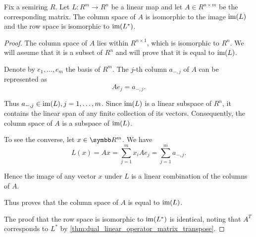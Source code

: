 \begin{proposition}\label{thm:column_and_row_spaces_are_images}
  Fix a semiring \( R \). Let \( L: R^m \to R^n \) be a linear map and let \( A \in R^{n \times m} \) be the corresponding matrix. The column space of \( A \) is isomorphic to the image \( \operatorname{im}(L) \) and the row space is isomorphic to \( \operatorname{im}(L^*) \).
\end{proposition}
\begin{proof}
  The column space of \( A \) lies within \( R^{n \times 1} \), which is isomorphic to \( R^n \). We will assume that it is a subset of \( R^n \) and will prove that it is equal to \( \operatorname{im}(L) \).

  Denote by \( e_1, \ldots, e_m \) the basis of \( R^m \). The \( j \)-th column \( a_{-,j} \) of \( A \) can be represented as
  \begin{equation*}
    A e_j = a_{-,j}.
  \end{equation*}

  Thus \( a_{-,j} \in \operatorname{im}(L), j = 1, \ldots, m \). Since \( \operatorname{im}(L) \) is a linear subspace of \( R^n \), it contains the linear span of any finite collection of its vectors. Consequently, the column space of \( A \) is a subspace of \( \operatorname{im}(L) \).

  To see the converse, let \( x \in \R^m \). We have
  \begin{equation*}
    L(x) = Ax = \sum_{j=1}^m x_i A e_j = \sum_{j=1}^m a_{-,j}.
  \end{equation*}

  Hence the image of any vector \( x \) under \( L \) is a linear combination of the columns of \( A \).

  Thus proves that the column space of \( A \) is equal to \( \operatorname{im}(L) \).

  The proof that the row space is isomorphic to \( \operatorname{im}(L^*) \) is identical, noting that \( A^T \) corresponds to \( L^* \) by \cref{thm:dual_linear_operator_matrix_transpose}.
\end{proof}
